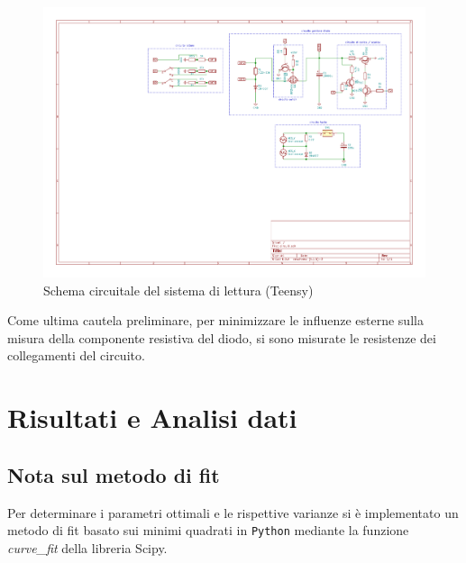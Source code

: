 \documentclass{article}[a4paper, oneside ,11pt]
\begin{document}
\begin{figure}[!htb]
	\centering 
 		\includegraphics[scale=2.2]{./measure.pdf}
 	\caption{Schema circuitale del sistema di lettura (Teensy) \label{sch:rdng}}
\end{figure}
Come ultima cautela preliminare, per minimizzare le influenze esterne sulla misura della componente resistiva del diodo, si sono misurate le resistenze dei collegamenti del circuito. 
\section{Risultati e Analisi dati}
\subsection{Nota sul metodo di fit}
Per determinare i parametri ottimali e le rispettive varianze si \`e implementato un metodo di fit basato sui minimi quadrati in \verb+Python+ mediante la funzione \emph{curve\_fit} della libreria Scipy\cite{scipy}.
\pagebreak


\end{document}
